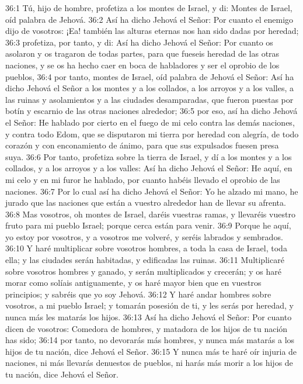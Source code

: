 36:1 Tú, hijo de hombre, profetiza a los montes de Israel, y di: Montes de Israel, oíd palabra de Jehová.   
36:2 Así ha dicho Jehová el Señor: Por cuanto el enemigo dijo de vosotros: ¡Ea! también las alturas eternas nos han sido dadas por heredad;   
36:3 profetiza, por tanto, y di: Así ha dicho Jehová el Señor: Por cuanto os asolaron y os tragaron de todas partes, para que fueseis heredad de las otras naciones, y se os ha hecho caer en boca de habladores y ser el oprobio de los pueblos,   
36:4 por tanto, montes de Israel, oíd palabra de Jehová el Señor: Así ha dicho Jehová el Señor a los montes y a los collados, a los arroyos y a los valles, a las ruinas y asolamientos y a las ciudades desamparadas, que fueron puestas por botín y escarnio de las otras naciones alrededor;   
36:5 por eso, así ha dicho Jehová el Señor: He hablado por cierto en el fuego de mi celo contra las demás naciones, y contra todo Edom, que se disputaron mi tierra por heredad con alegría, de todo corazón y con enconamiento de ánimo, para que sus expulsados fuesen presa suya.   
36:6 Por tanto, profetiza sobre la tierra de Israel, y dí a los montes y a los collados, y a los arroyos y a los valles: Así ha dicho Jehová el Señor: He aquí, en mi celo y en mi furor he hablado, por cuanto habéis llevado el oprobio de las naciones.   
36:7 Por lo cual así ha dicho Jehová el Señor: Yo he alzado mi mano, he jurado que las naciones que están a vuestro alrededor han de llevar su afrenta.   
36:8 Mas vosotros, oh montes de Israel, daréis vuestras ramas, y llevaréis vuestro fruto para mi pueblo Israel; porque cerca están para venir.   
36:9 Porque he aquí, yo estoy por vosotros, y a vosotros me volveré, y seréis labrados y sembrados.   
36:10 Y haré multiplicar sobre vosotros hombres, a toda la casa de Israel, toda ella; y las ciudades serán habitadas, y edificadas las ruinas.   
36:11 Multiplicaré sobre vosotros hombres y ganado, y serán multiplicados y crecerán; y os haré morar como solíais antiguamente, y os haré mayor bien que en vuestros principios; y sabréis que yo soy Jehová.   
36:12 Y haré andar hombres sobre vosotros, a mi pueblo Israel; y tomarán posesión de ti, y les serás por heredad, y nunca más les matarás los hijos.   
36:13 Así ha dicho Jehová el Señor: Por cuanto dicen de vosotros: Comedora de hombres, y matadora de los hijos de tu nación has sido;   
36:14 por tanto, no devorarás más hombres, y nunca más matarás a los hijos de tu nación, dice Jehová el Señor.   
36:15 Y nunca más te haré oír injuria de naciones, ni más llevarás denuestos de pueblos, ni harás más morir a los hijos de tu nación, dice Jehová el Señor.   
